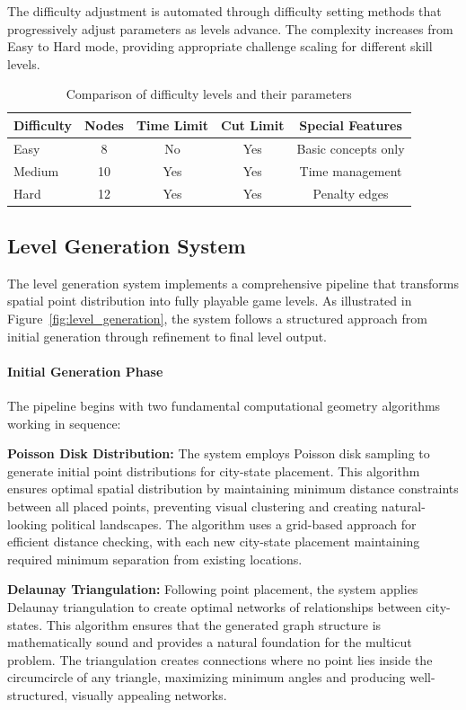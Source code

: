 \documentclass[english]{tudscrreprt}
\begin{document}
The difficulty adjustment is automated through difficulty setting methods that progressively adjust parameters as levels advance. The complexity increases from Easy to Hard mode, providing appropriate challenge scaling for different skill levels.

\begin{table}[h]
\centering
\caption{Comparison of difficulty levels and their parameters}
\begin{tabular}{lcccc}
\toprule
\textbf{Difficulty} & \textbf{Nodes} & \textbf{Time Limit} & \textbf{Cut Limit} & \textbf{Special Features} \\
\midrule
Easy & 8 & No & Yes & Basic concepts only \\
Medium & 10 & Yes & Yes & Time management \\
Hard & 12 & Yes & Yes & Penalty edges \\
\bottomrule
\end{tabular}
\label{tab:difficulty_comparison}
\end{table}

\subsection{Level Generation System}
The level generation system implements a comprehensive pipeline that transforms spatial point distribution into fully playable game levels. As illustrated in Figure~\ref{fig:level_generation}, the system follows a structured approach from initial generation through refinement to final level output.

\paragraph{Initial Generation Phase}
The pipeline begins with two fundamental computational geometry algorithms working in sequence:

\textbf{Poisson Disk Distribution:} The system employs Poisson disk sampling to generate initial point distributions for city-state placement. This algorithm ensures optimal spatial distribution by maintaining minimum distance constraints between all placed points, preventing visual clustering and creating natural-looking political landscapes. The algorithm uses a grid-based approach for efficient distance checking, with each new city-state placement maintaining required minimum separation from existing locations.

\textbf{Delaunay Triangulation:} Following point placement, the system applies Delaunay triangulation to create optimal networks of relationships between city-states. This algorithm ensures that the generated graph structure is mathematically sound and provides a natural foundation for the multicut problem. The triangulation creates connections where no point lies inside the circumcircle of any triangle, maximizing minimum angles and producing well-structured, visually appealing networks.
\end{document}
